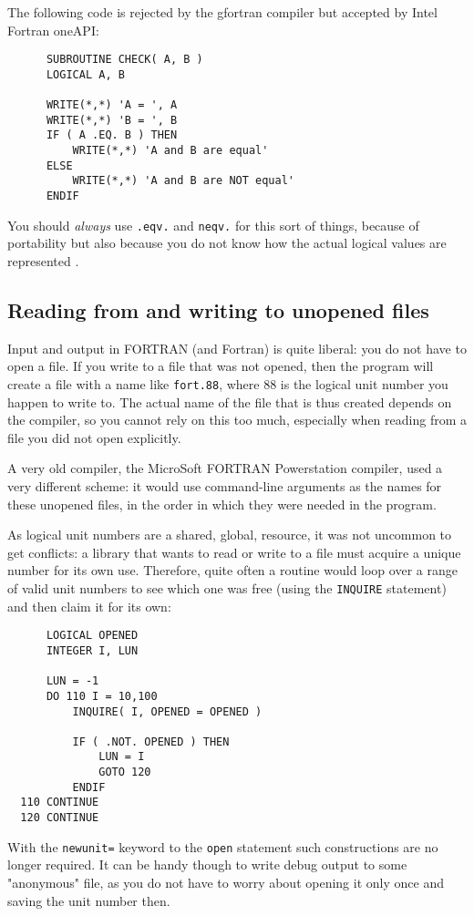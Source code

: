 The following code is rejected by the gfortran compiler but accepted by Intel Fortran oneAPI:
\begin{verbatim}
      SUBROUTINE CHECK( A, B )
      LOGICAL A, B

      WRITE(*,*) 'A = ', A
      WRITE(*,*) 'B = ', B
      IF ( A .EQ. B ) THEN
          WRITE(*,*) 'A and B are equal'
      ELSE
          WRITE(*,*) 'A and B are NOT equal'
      ENDIF
\end{verbatim}

You should \emph{always} use \verb+.eqv.+ and \verb+neqv.+ for this sort of things, because of
portability but also because you do not know how the actual logical values are represented \cite{DrFortranEquiv}.


\subsection{Reading from and writing to unopened files}
Input and output in FORTRAN (and Fortran) is quite liberal: you do not have to open a file. If you write to
a file that was not opened, then the program will create a file with a name like \verb+fort.88+, where 88
is the logical unit number you happen to write to. The actual name of the file that is thus created
depends on the compiler, so you cannot rely on this too much, especially when reading from a file
you did not open explicitly.

A very old compiler, the MicroSoft FORTRAN Powerstation compiler, used a very different scheme:
it would use command-line arguments as the names for these unopened files,
in the order in which they were needed in the program.

As logical unit numbers are a shared, global, resource, it was not uncommon to get conflicts: a library
that wants to read or write to a file must acquire a unique number for its own use. Therefore, quite
often a routine would loop over a range of valid unit numbers to see which one was free (using the \verb+INQUIRE+
statement) and then claim it for its own:
\begin{verbatim}
      LOGICAL OPENED
      INTEGER I, LUN

      LUN = -1
      DO 110 I = 10,100
          INQUIRE( I, OPENED = OPENED )

          IF ( .NOT. OPENED ) THEN
              LUN = I
              GOTO 120
          ENDIF
  110 CONTINUE
  120 CONTINUE
\end{verbatim}

With the \verb+newunit=+ keyword to the \verb+open+ statement such constructions are no longer required.
It can be handy though to write debug output to some "anonymous" file, as you do not have to worry
about opening it only once and saving the unit number then.
